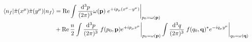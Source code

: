 \begin{lemma}\label{thm:number_state_momentum_density_corr}
	\begin{equation}
		\begin{split}
			\expval{\hat\pi(x^\mu)\hat\pi(y^\mu)}{n_f}
			&=
			\Re
			\int\frac{\dd[3]{p}}{(2\pi)^3}
			\omega(\vb{p})
			\eval{e^{+ip_\mu(x^\mu-y^\mu)}}_{p_0=\omega(\vb{p})}
			\\
			&+
			\Re
			\frac{n}{2}
			\int\frac{\dd[3]{p}}{(2\pi)^3}
			\eval{
				f(p_0,\vb{p})
				e^{+ip_\mu x^\mu}
			}_{p_0=\omega(\vb{p})}
			\int\frac{\dd[3]{q}}{(2\pi)^3}
			\eval{
				f(q_0,\vb{q})^*
				e^{-iq_\mu y^\mu}
			}_{q_0=\omega(\vb{q})}
		\end{split}
	\end{equation}
\end{lemma}

